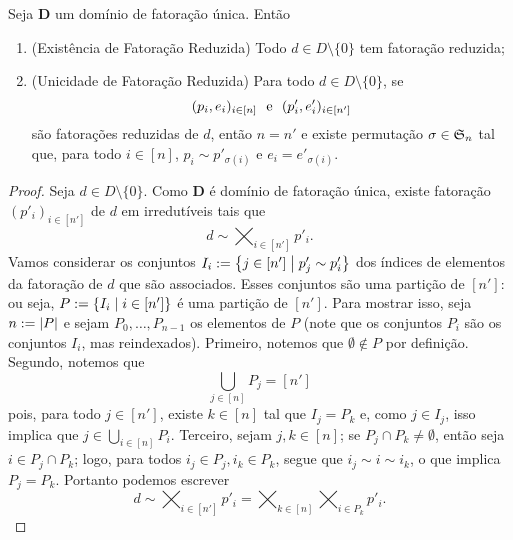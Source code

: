 \begin{prop}
Seja $\bm D$ um domínio de fatoração única. Então
	\begin{enumerate}
	\item (Existência de Fatoração Reduzida) Todo $d \in D \setminus \{0\}$ tem fatoração reduzida;
	\item (Unicidade de Fatoração Reduzida) Para todo $d \in D \setminus \{0\}$, se
	\begin{equation*}
	(p_i,e_i)_{i \in [n]} \text{\ \ e\ \ } (p'_i,e'_i)_{i \in [n']}
	\end{equation*}
são fatorações reduzidas de $d$, então $n=n'$ e existe permutação $\sigma \in \mathfrak{S}_n$ tal que, para todo $i \in [n]$, $p_i \sim p'_{\sigma(i)}$ e $e_i=e'_{\sigma(i)}$.
	\end{enumerate}
\end{prop}
\begin{proof}
Seja $d \in D \setminus \{0\}$. Como $\bm D$ é domínio de fatoração única, existe fatoração $(p'_i)_{i \in [n']}$ de $d$ em irredutíveis tais que
	\begin{equation*}
	d \sim \bigtimes_{i \in [n']} p'_i.
	\end{equation*}
Vamos considerar os conjuntos $I_i := \left\{j \in [n'] \;\middle\vert\; p'_j \sim p'_i \right\}$ dos índices de elementos da fatoração de $d$ que são associados. Esses conjuntos são uma partição de $[n']$: ou seja, $P := \left\{I_i \;\middle\vert\; i \in [n'] \right\}$ é uma partição de $[n']$. Para mostrar isso, seja $n := \left\vert{P}\right\vert$ e sejam $P_0,\ldots,P_{n-1}$ os elementos de $P$  (note que os conjuntos $P_i$ são os conjuntos $I_i$, mas reindexados). Primeiro, notemos que $\emptyset \notin P$ por definição. Segundo, notemos que
	\begin{equation*}
	\bigcup_{j \in [n]} P_j = [n']
	\end{equation*}
pois, para todo $j \in [n']$, existe $k \in [n]$ tal que $I_j = P_k$ e, como $j \in I_j$, isso implica que $j \in \bigcup_{i \in [n]} P_i$. Terceiro, sejam $j,k \in [n]$; se $P_j \cap P_k \neq \emptyset$, então seja $i \in P_j \cap P_k$; logo, para todos $i_j \in P_j,i_k \in P_k$, segue que $i_j \sim i \sim i_k$, o que implica $P_j=P_k$. Portanto podemos escrever
	\begin{equation*}
	d \sim \bigtimes_{i \in [n']} p'_i = \bigtimes_{k \in [n]} \bigtimes_{i \in P_k} p'_i.
	\end{equation*}


\end{proof}
